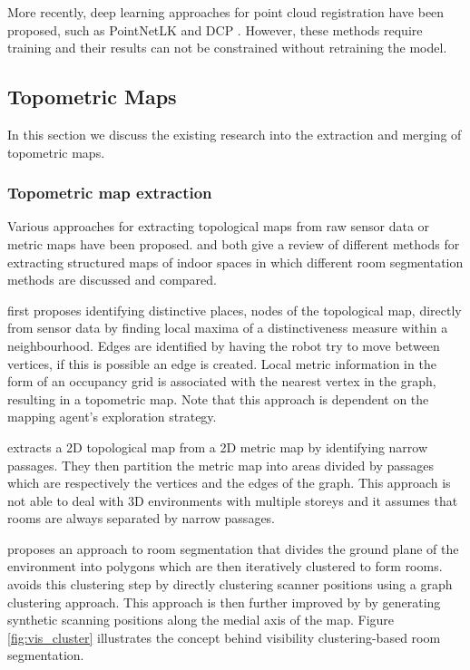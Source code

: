 More recently, deep learning approaches for point cloud registration have been proposed, such as PointNetLK and DCP \citep{aoki_pointnetlk_2019,wang_deep_2019}. However, these methods require training and their results can not be constrained without retraining the model.

\pagebreak

\subsection{Topometric Maps}
In this section we discuss the existing research into the extraction and merging of topometric maps.

\subsubsection{Topometric map extraction}
Various approaches for extracting topological maps from raw sensor data or metric maps have been proposed. \citet{bormann_room_2016} and \citet{pintore_state---art_2020} both give a review of different methods for extracting structured maps of indoor spaces in which different room segmentation methods are discussed and compared.

\citet{kuipers_robot_1991} first proposes identifying distinctive places, nodes of the topological map, directly from sensor data by finding local maxima of a distinctiveness measure within a neighbourhood. Edges are identified by having the robot try to move between vertices, if this is possible an edge is created. Local metric information in the form of an occupancy grid is associated with the nearest vertex in the graph, resulting in a topometric map. Note that this approach is dependent on the mapping agent's exploration strategy. 

\citet{thrun_learning_1998} extracts a 2D topological map from a 2D metric map by identifying narrow passages. They then partition the metric map into areas divided by passages which are respectively the vertices and the edges of the graph. This approach is not able to deal with 3D environments with multiple storeys and it assumes that rooms are always separated by narrow passages.

\citet{mura_automatic_2014} proposes an approach to room segmentation that divides the ground plane of the environment into polygons which are then iteratively clustered to form rooms. \citet{mura_piecewise-planar_2016} avoids this clustering step by directly clustering scanner positions using a graph clustering approach. This approach is then further improved by \citet{ambrus_automatic_2017} by generating synthetic scanning positions along the medial axis of the map. Figure \ref{fig:vis_cluster} illustrates the concept behind visibility clustering-based room segmentation.

